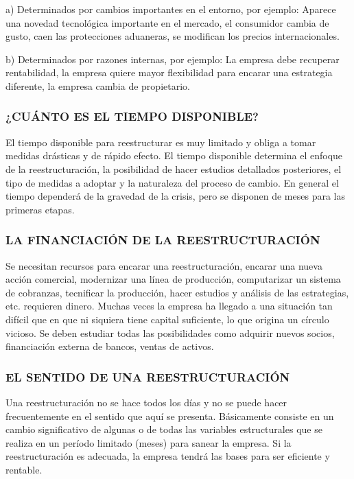 a) Determinados por cambios importantes en el entorno, por ejemplo: Aparece una novedad tecnológica importante en el mercado, el consumidor cambia de gusto, caen las protecciones aduaneras, se modifican los precios internacionales.

b) Determinados por razones internas, por ejemplo: La empresa debe recuperar rentabilidad, la empresa quiere mayor flexibilidad para encarar una estrategia diferente, la empresa cambia de propietario.

\subsubsection*{¿CUÁNTO ES EL TIEMPO DISPONIBLE?}
El tiempo disponible para reestructurar es muy limitado y obliga a tomar medidas drásticas y de rápido efecto. El tiempo disponible determina el enfoque de la reestructuración, la posibilidad de hacer estudios detallados posteriores, el tipo de medidas a adoptar y la naturaleza del proceso de cambio. En general el tiempo dependerá de la gravedad de la crisis, pero se disponen de meses para las primeras etapas.

\subsubsection*{LA FINANCIACIÓN DE LA REESTRUCTURACIÓN}
Se necesitan recursos para encarar una reestructuración, encarar una nueva acción comercial, modernizar una línea de producción, computarizar un sistema de cobranzas, tecnificar la producción, hacer estudios y análisis de las estrategias, etc. requieren dinero. Muchas veces la empresa ha llegado a una situación tan difícil que en que ni siquiera tiene capital suficiente, lo que origina un círculo vicioso. Se deben estudiar todas las posibilidades como adquirir nuevos socios, financiación externa de bancos, ventas de activos.

\subsubsection*{EL SENTIDO DE UNA REESTRUCTURACIÓN}
Una reestructuración no se hace todos los días y no se puede hacer frecuentemente en el sentido que aquí se presenta. Básicamente consiste en un cambio significativo de algunas o de todas las variables estructurales que se realiza en un período limitado (meses) para sanear la empresa. Si la reestructuración es adecuada, la empresa tendrá las bases para ser eficiente y rentable.


